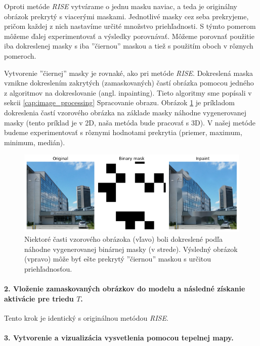 Oproti metóde \textit{RISE} vytvárame o jednu masku naviac, a teda je originálny obrázok prekrytý s viacerými maskami. Jednotlivé masky cez seba prekryjeme, pričom každej z nich nastavíme určité množstvo priehľadnosti. S týmto pomerom môžeme ďalej experimentovať a výsledky porovnávať. Môžeme porovnať použitie iba dokreslenej masky s iba ''čiernou'' maskou a tiež s použitím oboch v rôznych pomeroch.

Vytvorenie ''čiernej'' masky je rovnaké, ako pri metóde \textit{RISE}. Dokreslená maska vznikne dokreslením zakrytých (zamaskovaných) častí obrázka pomocou jedného z algoritmov na dokreslovanie (angl. inpainting). Tieto algoritmy sme popísali v sekcii \ref{cap:image_processing} Spracovanie obrazu. Obrázok \ref{fig:risei_inpainting_example} je príkladom dokreslenia častí vzorového obrázka na základe masky náhodne vygenerovanej masky (tento príklad je v 2D, naša metóda bude pracovať s 3D). V našej metóde budeme experimentovať s rôznymi hodnotami prekrytia (priemer, maximum, minimum, medián).

\begin{figure}[h!]
    \centering
    \includegraphics[width=13cm]{assets/images/risei_inpainting_example.png}
    \caption{Niektoré časti vzorového obrázoka (vľavo) boli dokreslené podľa náhodne vygenerovanej binárnej masky (v strede). Výsledný obrázok (vpravo) môže byť ešte prekrytý ''čiernou'' maskou s určitou priehľadnosťou.}
    \label{fig:risei_inpainting_example}
\end{figure}

\paragraph{2. Vloženie zamaskovaných obrázkov do modelu a následné získanie aktivácie pre triedu $T$.}

Tento krok je identický s originálnou metódou \textit{RISE}.

\paragraph{3. Vytvorenie a vizualizácia vysvetlenia pomocou tepelnej mapy.}

